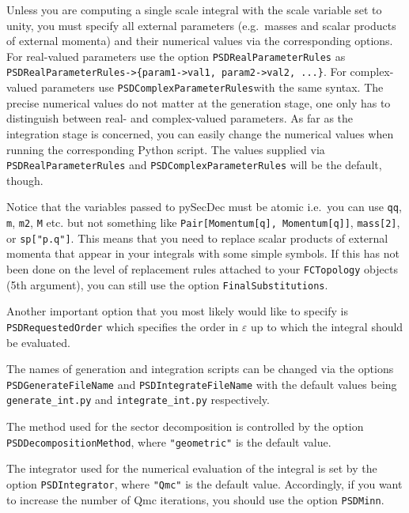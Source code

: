 \documentclass[../FeynHelpersManual.tex]{subfiles}
\begin{document}
Unless you are computing a single scale integral with the scale variable
set to unity, you must specify all external parameters (e.g.~masses and
scalar products of external momenta) and their numerical values via the
corresponding options. For real-valued parameters use the option
\texttt{PSDRealParameterRules} as
\texttt{PSDRealParameterRules->\{\allowbreak{}param1->val1,\ \allowbreak{}param2->val2,\ \allowbreak{}...\}}.
For complex-valued parameters use \texttt{PSDComplexParameterRules}with
the same syntax. The precise numerical values do not matter at the
generation stage, one only has to distinguish between real- and
complex-valued parameters. As far as the integration stage is concerned,
you can easily change the numerical values when running the
corresponding Python script. The values supplied via
\texttt{PSDRealParameterRules} and \texttt{PSDComplexParameterRules}
will be the default, though.

Notice that the variables passed to pySecDec must be atomic i.e.~you can
use \texttt{qq}, \texttt{m}, \texttt{m2}, \texttt{M} etc. but not
something like
\texttt{Pair[\allowbreak{}Momentum[\allowbreak{}q],\ \allowbreak{}Momentum[\allowbreak{}q]]},
\texttt{mass[\allowbreak{}2]}, or \texttt{sp[\allowbreak{}"p.q"]}. This
means that you need to replace scalar products of external momenta that
appear in your integrals with some simple symbols. If this has not been
done on the level of replacement rules attached to your
\texttt{FCTopology} objects (5th argument), you can still use the option
\texttt{FinalSubstitutions}.

Another important option that you most likely would like to specify is
\texttt{PSDRequestedOrder} which specifies the order in \(\varepsilon\)
up to which the integral should be evaluated.

The names of generation and integration scripts can be changed via the
options \texttt{PSDGenerateFileName} and \texttt{PSDIntegrateFileName}
with the default values being \texttt{generate_int.py} and
\texttt{integrate_int.py} respectively.

The method used for the sector decomposition is controlled by the option
\texttt{PSDDecompositionMethod}, where \texttt{"geometric"} is the
default value.

The integrator used for the numerical evaluation of the integral is set
by the option \texttt{PSDIntegrator}, where \texttt{"Qmc"} is the
default value. Accordingly, if you want to increase the number of Qmc
iterations, you should use the option \texttt{PSDMinn}.
\end{document}
